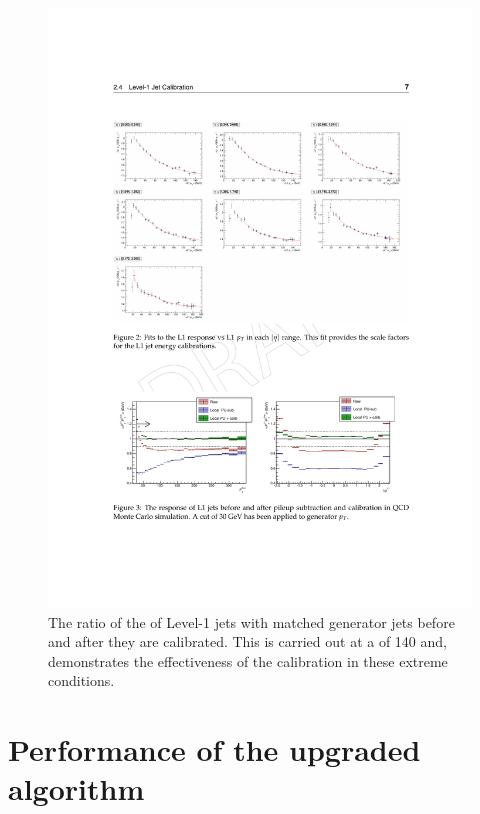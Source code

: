 \begin{figure}
	\begin{center}
		\includegraphics[width=1.0\linewidth]{figs/trigger/pu140_calib_closure}
  \caption{The ratio of the \pT of Level-1 jets with matched generator
  jets before and after they are calibrated. This is carried out at a
  \PU of 140 and, demonstrates the effectiveness of the calibration in
  these extreme conditions.}
  \label{fig:pu140calibclosure}
	\end{center}
\end{figure}

\section{Performance of the upgraded algorithm}

\label{sec:jet_algo_performance}

